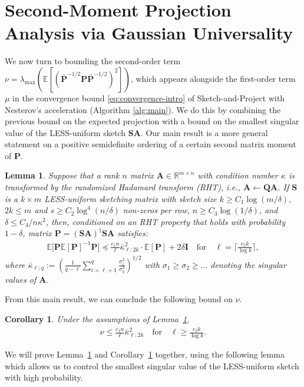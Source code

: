 \documentclass[11pt]{article}
\def\A{{\mathbf A}}
\def\I{{\mathbf I}}
\def\Q{{\mathbf Q}}
\def\S{{\mathbf S}}
\def\P{{\mathbf P}}
\def\E{{\mathds E}}
\def\R{{\mathbf R}}
\def\R{{\mathds R}}
\newtheorem{lem}[thm]{Lemma}
\newtheorem{cor}[thm]{Corollary}
\begin{document}
\section{Second-Moment Projection Analysis via Gaussian Universality}
\label{s:nu}
We now turn to bounding the second-order term $\nu = \lambda_{\max}(\E[(\bar\P^{-1/2}\P\bar\P^{-1/2})^2])$, which appears alongside the first-order term $\mu$ in the convergence bound \eqref{eq:convergence-intro} of Sketch-and-Project with Nesterov's acceleration (Algorithm \ref{alg:main}). We do this by combining the previous bound on the expected projection with a bound on the smallest singular value of the LESS-uniform sketch $\S\A$. Our main result is a more general statement on a positive semidefinite ordering of a certain second matrix moment of $\P$.

\begin{lem}\label{l:nu-gaussian}
Suppose that a rank $n$ matrix $\A\in\R^{m\times n}$ with condition number $\kappa$ is transformed by the randomized Hadamard transform (RHT), i.e., $\A\leftarrow \Q\A$. If $\S$ is a $k\times m$ LESS-uniform sketching matrix with sketch size $k\geq C_1\log(m/\delta)$, $2k \leq m$ and $s\geq C_2\log^4(n/\delta)$ non-zeros per row, $n \geq C_3 \log(1 / \delta)$, and $\delta \leq C_4 / n \kappa^2$, then, conditioned on an RHT property that holds with probability $1-\delta$, matrix $\P=(\S\A)^{\dagger}\S\A$ satisfies:
\begin{align*}
    \E\big[\P\E[\P]^{-1}\P\big] \preceq \frac { c_1 n}{\ell} \bar\kappa_{\ell:2k}^2 \cdot\E[\P] + 2\delta\I 
    \quad\text{for}\quad \ell= \Big\lceil\frac{c_2k}{\log k}\Big\rceil,
\end{align*}
where $\bar\kappa_{\ell:q}:= (\frac1{q-\ell}\sum_{i=\ell+1}^q\frac{\sigma_i^2}{\sigma_q^2})^{1/2}$ with $\sigma_1\geq \sigma_2\geq ...$ denoting the singular values of $\A$. 
\end{lem}
\noindent
From this main result, we can conclude the following bound on $\nu$.
\begin{cor}
    \label{c:nu-bound}
    Under the assumptions of Lemma~\ref{l:nu-gaussian},
\begin{align}
    \nu \leq \frac{c_1 n}{\ell} \bar\kappa_{\ell:2k}^2
    \quad\text{for}\quad
    \ell \geq \frac{c_2 k}{\log k}.
\end{align}
\end{cor}

\noindent
We will prove  Lemma~\ref{l:nu-gaussian} and Corollary~\ref{c:nu-bound} together, using the following lemma which allows us to control the smallest singular value of the LESS-uniform sketch with high probability. 
\end{document}
